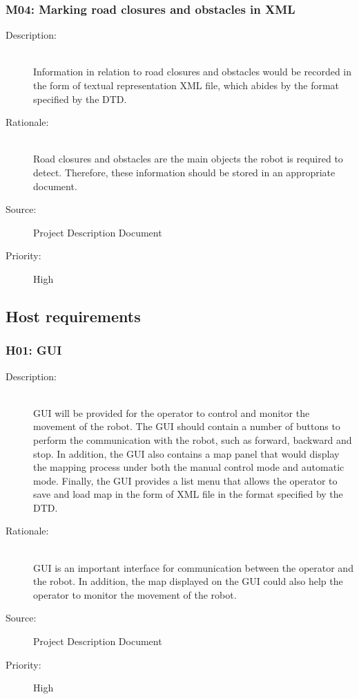 \documentclass[titlepage]{article}
\begin{document}
\subsubsection{M04: Marking road closures and obstacles in XML }
\begin{description}
\item[Description: ] \hfill \\Information in relation to road closures and obstacles would be recorded in the form of textual representation XML file, which abides by the format specified by the DTD.
\item[Rationale: ] \hfill \\Road closures and obstacles are the main objects the robot is required to detect. Therefore, these information should be stored in an appropriate document.
\item[Source: ] Project Description Document
\item[Priority: ] High
\end{description}



\subsection{Host requirements}
\subsubsection{H01: GUI }
\begin{description}
\item[Description: ] \hfill \\ GUI will be provided for the operator to control and monitor the movement of the robot. The GUI should contain a number of buttons to perform the communication with the robot, such as forward, backward and stop. In addition, the GUI also contains a map panel that would display the mapping process under both the manual control mode and automatic mode. Finally, the GUI provides a list menu that allows the operator to save and load map in the form of XML file in the format specified by the DTD.
\item[Rationale: ] \hfill \\GUI is an important interface for communication between the operator and the robot. In addition, the map displayed on the GUI could also help the operator to monitor the movement of the robot.
\item[Source: ] Project Description Document
\item[Priority: ] High
\end{description}
\end{document}
